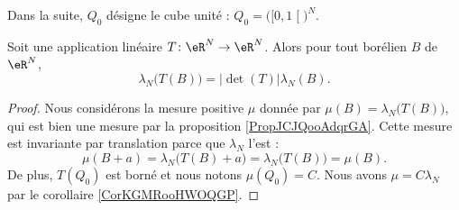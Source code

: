 Dans la suite, \( Q_0\) désigne le cube unité : \( Q_0=\big( \mathopen[ 0 , 1 \mathclose[ \big)^N\).

\begin{theorem}    \label{ThoBVIJooMkifod}
    Soit une application linéaire \( T\colon \eR^N\to \eR^N\). Alors pour tout borélien \( B\) de \( \eR^N\),
    \begin{equation}
        \lambda_N\big( T(B) \big)=| \det(T) |\lambda_N(B).
    \end{equation}
\end{theorem}

\begin{proof}
    Nous considérons la mesure positive \( \mu\) donnée par \( \mu(B)=\lambda_N\big( T(B) \big)\), qui est bien une mesure par la proposition \ref{PropJCJQooAdqrGA}. Cette mesure est invariante par translation parce que \( \lambda_N\) l'est :
    \begin{equation}
        \mu(B+a)=\lambda_N\big( T(B)+a \big)=\lambda_N\big( T(B) \big)=\mu(B).
    \end{equation}
    De plus, \( T(Q_0)\) est borné et nous notons \( \mu(Q_0)=C\). Nous avons \( \mu=C\lambda_N\) par le corollaire \ref{CorKGMRooHWOQGP}.


\end{proof}
